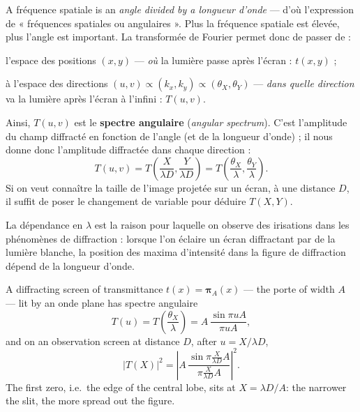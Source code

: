 \begin{conclusion}
  A fréquence spatiale is an \emph{angle divided by a longueur d'onde} ---
  d'où l'expression de « fréquences spatiales ou angulaires ». Plus la
  fréquence spatiale est élevée, plus l'angle est important. La transformée de
  Fourier permet donc de passer de :
  \begin{subpart}
    \item l'espace des positions $(x,y)$ --- \emph{où} la lumière passe après
      l'écran : $t(x,y)$ ;
    \item à l'espace des directions $(u,v) \propto (k_x,k_y) \propto
      (\theta_X,\theta_Y)$ --- \emph{dans quelle direction} va la lumière après
      l'écran à l'infini : $T(u,v)$.
  \end{subpart}
  Ainsi, $T(u,v)$ est le \textbf{spectre angulaire} (\textit{angular
  spectrum}). C'est l'amplitude du champ diffracté en fonction de l'angle (et de
  la longueur d'onde) ; il nous donne donc l'amplitude diffractée dans chaque
  direction :
  \[
    T(u,v) = T\!\left(\frac{X}{\lambda D}, \frac{Y}{\lambda D}\right)
           = T\!\left(\frac{\theta_X}{\lambda}, \frac{\theta_Y}{\lambda}\right).
  \]
  Si on veut connaître la taille de l'image projetée sur un écran, à une
  distance $D$, il suffit de poser le changement de variable pour déduire
  $T(X,Y)$.
\end{conclusion}

La dépendance en $\lambda$ est la raison pour laquelle on observe des irisations
dans les phénomènes de diffraction : lorsque l'on éclaire un écran diffractant
par de la lumière blanche, la position des maxima d'intensité dans la figure de
diffraction dépend de la longueur d'onde.

\begin{example}
  A diffracting screen of transmittance $t(x) = \bm{\pi}_A(x)$ --- the porte of
  width $A$ --- lit by an onde plane has spectre angulaire
  \[
    T(u) = T\!\left(\frac{\theta_X}{\lambda}\right) = A\,\frac{\sin \pi u A}{\pi u A},
  \]
  and on an observation screen at distance $D$, after $u = X/\lambda D$,
  \[
    |T(X)|^2 = \left| A\,
      \frac{\sin \pi \frac{X}{\lambda D} A}{\pi \frac{X}{\lambda D} A} \right|^2 .
  \]
  The first zero, i.e.\ the edge of the central lobe, sits at
  $X = \lambda D / A$: the narrower the slit, the more spread out the figure.
\end{example}

